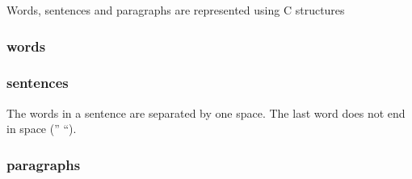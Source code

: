 Words, sentences and paragraphs are represented using C structures

\subsubsection{words}\label{lab-exercise-1-structuring-the-document.md__words}

\begin{Shaded}
\begin{Highlighting}[]
\OperatorTok{\{}
    \OperatorTok{*}\OperatorTok{;}
\OperatorTok{\};}
\end{Highlighting}
\end{Shaded}

\subsubsection{sentences}\label{lab-exercise-1-structuring-the-document.md__sentences}

\begin{Shaded}
\begin{Highlighting}[]
\OperatorTok{\{}
    \OperatorTok{*}\OperatorTok{;}
    \OperatorTok{;}
\OperatorTok{\};}
\end{Highlighting}
\end{Shaded}

The words in a sentence are separated by one space. The last word does
not end in space ('' ``).

\subsubsection{paragraphs}\label{lab-exercise-1-structuring-the-document.md__paragraphs}

\begin{Shaded}
\begin{Highlighting}[]
\OperatorTok{\{}
    \OperatorTok{*}\OperatorTok{;}
    \OperatorTok{;}
\OperatorTok{\};}
\end{Highlighting}
\end{Shaded}

